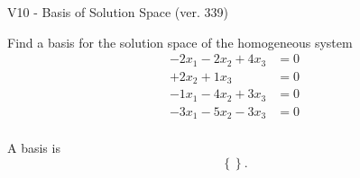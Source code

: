 \begin{exercise}
  \begin{exerciseTitle}V10 - Basis of Solution Space (ver. 339)\end{exerciseTitle}
  \begin{exerciseStatement}
    Find a basis for the solution space of the homogeneous system 
\begin{align*}
 -2 x_ 1 -2 x_ 2 + 4 x_ 3 &= 0  \\ 
  + 2 x_ 2 + 1 x_ 3 &= 0  \\ 
  -1 x_ 1 -4 x_ 2 + 3 x_ 3 &= 0  \\ 
  -3 x_ 1 -5 x_ 2 -3 x_ 3 &= 0  \\ 
 \end{align*}


 
  \end{exerciseStatement}

  \begin{exerciseAnswer}
   A basis is   
\[\left\{\right\}.\]

  


  \end{exerciseAnswer}
\end{exercise}